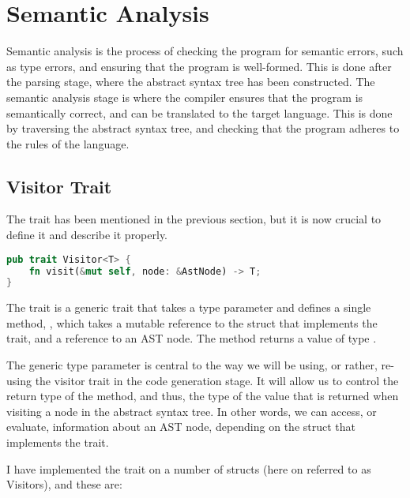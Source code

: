 \section{Semantic Analysis}

Semantic analysis is the process of checking the program for semantic errors,
such as type errors, and ensuring that the program is well-formed. This is done
after the parsing stage, where the abstract syntax tree has been constructed.
The semantic analysis stage is where the compiler ensures that the program is
semantically correct, and can be translated to the target language. This is done
by traversing the abstract syntax tree, and checking that the program adheres to
the rules of the language.

\subsection{Visitor Trait}

The  trait has been mentioned in the previous section, but it is
now crucial to define it and describe it properly.

\begin{mainbox}{}
    \lstset{xleftmargin=0.2\textwidth, aboveskip=0pt, belowskip=0pt}
    \begin{lstlisting}[language=Rust]
pub trait Visitor<T> {
    fn visit(&mut self, node: &AstNode) -> T;
}
\end{lstlisting}
\end{mainbox}

The  trait is a generic trait that takes a type parameter 
and defines a single method, , which takes a mutable reference to
the struct that implements the trait, and a reference to an AST node. The method
returns a value of type .

The generic type parameter  is central to the way we will be using, or
rather, re-using the visitor trait in the code generation stage. It will allow
us to control the return type of the  method, and thus, the type of
the value that is returned when visiting a node in the abstract syntax tree. In
other words, we can access, or evaluate, information about an AST node,
depending on the struct that implements the  trait.

I have implemented the  trait on a number of structs (here on referred to as Visitors), and these are:

